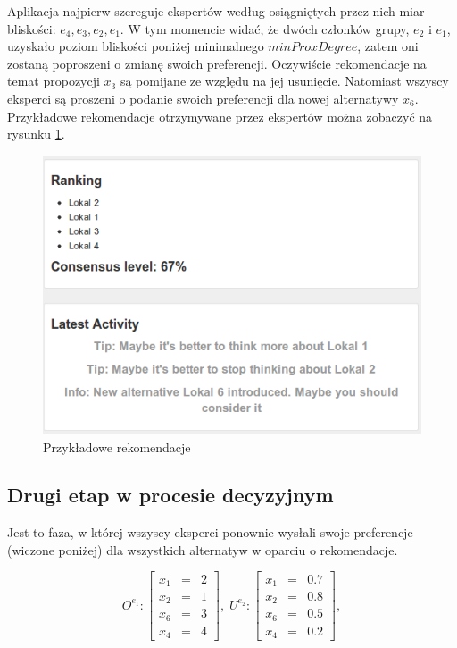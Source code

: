 Aplikacja najpierw szereguje ekspertów według osiągniętych przez nich miar
bliskości: $e_4, e_3, e_2, e_1$. W tym momencie widać, że dwóch członków grupy,
$e_2$ i $e_1$, uzyskało poziom bliskości poniżej minimalnego $minProxDegree$,
zatem oni zostaną poproszeni o zmianę swoich preferencji. Oczywiście
rekomendacje na temat propozycji $x_3$ są pomijane ze względu na jej usunięcie.
Natomiast wszyscy eksperci są proszeni o podanie swoich preferencji dla nowej
alternatywy $x_6$. Przykładowe rekomendacje otrzymywane przez ekspertów można
zobaczyć na rysunku \ref{fig:feedback}.
\begin{figure}[!htbp]
  \includegraphics[width=\linewidth]
    {chapters/prototyp/tdm_feedback}
  \caption{Przykładowe rekomendacje}
  \label{fig:feedback}
\end{figure}

\subsection{Drugi etap w procesie decyzyjnym}
Jest to faza, w której wszyscy eksperci ponownie wysłali swoje preferencje
(wiczone poniżej) dla wszystkich alternatyw w oparciu o rekomendacje. 

$$
O^{e_1} :
\left [ 
\begin{array}{lcr}
x_1  & = & 2    \\
x_2  & = & 1 \\
x_6  & = & 3 \\
x_4  & = & 4
\end{array}\right ],\;
U^{e_2} : 
\left [ 
\begin{array}{lcr}
x_1 & = & 0.7    \\
x_2  & = & 0.8    \\
x_6  & = & 0.5 \\
x_4  & = & 0.2
\end{array}\right ],
$$

